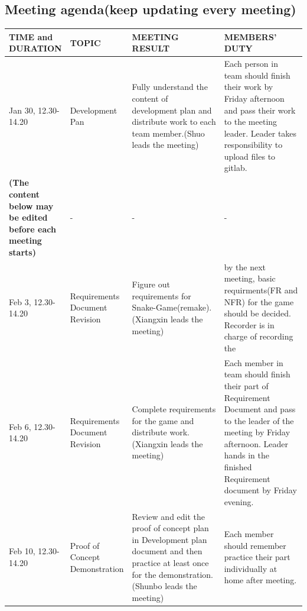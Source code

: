 \documentclass{article}
\begin{document}
\subsection{Meeting agenda(keep updating every meeting)}
\begin{tabular}{ |p{0.15\linewidth}|p{0.20\linewidth}|p{0.35\linewidth}|p{0.30\linewidth}| }
        \hline
        \rowcolor[HTML]{C0C0C0}
        \textbf{TIME and DURATION} & \textbf{TOPIC} & \textbf{MEETING RESULT} & \textbf{MEMBERS' DUTY} \\ \hline
        Jan 30, 12.30-14.20 & Development Pan & Fully understand the content of development plan and distribute work to each team member.(Shuo leads the meeting) & Each person in team should finish their work by Friday afternoon and pass their work to the meeting leader. Leader takes responsibility to upload files to gitlab.  \\
        
        
        \rowcolor[HTML]{C0C0C0}
        \textbf{(The content below may be edited before each meeting starts)} & - & - & - \\
        
        \hline
        Feb 3, 12.30-14.20 & Requirements Document Revision & Figure out requirements for Snake-Game(remake). (Xiangxin leads the meeting) & by the next meeting, basic requirments(FR and NFR) for the game should be decided. Recorder is in charge of recording the \\
        \hline
        Feb 6, 12.30-14.20 & Requirements Document Revision & Complete requirements for the game and distribute work.(Xiangxin leads the meeting)  & Each member in team should finish their part of Requirement Document and pass to the leader of the meeting by Friday afternoon. Leader hands in the finished Requirement document by Friday evening.\\
        \hline
        Feb 10, 12.30-14.20 & Proof of Concept Demonstration & Review and edit the proof of concept plan in Development plan document and then practice at least once for the demonstration.(Shunbo leads the meeting) & Each member should remember practice their part individually at home after meeting. \\
        \hline
        \end{tabular}
\end{document}
